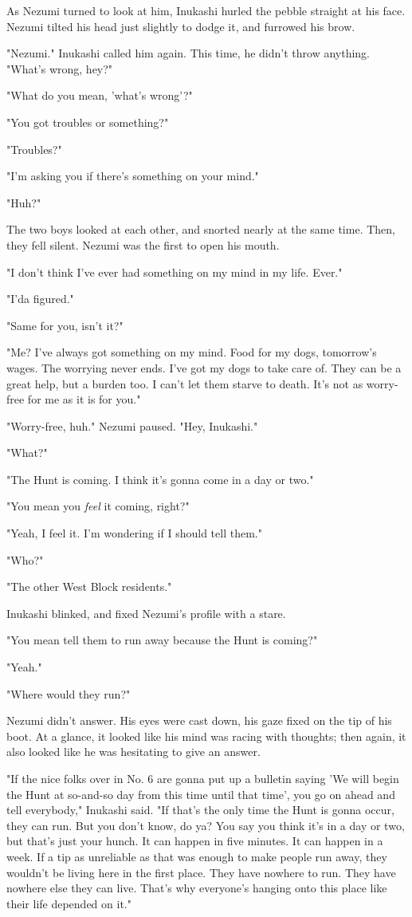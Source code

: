 As Nezumi turned to look at him, Inukashi hurled the pebble straight at
his face. Nezumi tilted his head just slightly to dodge it, and furrowed
his brow.

"Nezumi." Inukashi called him again. This time, he didn't throw
anything. "What's wrong, hey?"

"What do you mean, 'what's wrong'?"

"You got troubles or something?"

"Troubles?"

"I'm asking you if there's something on your mind."~

"Huh?"

The two boys looked at each other, and snorted nearly at the same time.
Then, they fell silent. Nezumi was the first to open his mouth.

"I don't think I've ever had something on my mind in my life. Ever."

"I'da figured."

"Same for you, isn't it?"

"Me? I've always got something on my mind. Food for my dogs, tomorrow's
wages. The worrying never ends. I've got my dogs to take care of. They
can be a great help, but a burden too. I can't let them starve to death.
It's not as worry-free for me as it is for you."

"Worry-free, huh." Nezumi paused. "Hey, Inukashi."

"What?"

"The Hunt is coming. I think it's gonna come in a day or two."

"You mean you \emph{feel} it coming, right?"

"Yeah, I feel it. I'm wondering if I should tell them."

"Who?"

"The other West Block residents."

Inukashi blinked, and fixed Nezumi's profile with a stare.

"You mean tell them to run away because the Hunt is coming?"

"Yeah."

"Where would they run?"

Nezumi didn't answer. His eyes were cast down, his gaze fixed on the tip
of his boot. At a glance, it looked like his mind was racing with
thoughts; then again, it also looked like he was hesitating to give an
answer.

"If the nice folks over in No. 6 are gonna put up a bulletin saying 'We
will begin the Hunt at so-and-so day from this time until that time',
you go on ahead and tell everybody," Inukashi said. "If that's the only
time the Hunt is gonna occur, they can run. But you don't know, do ya?
You say you think it's in a day or two, but that's just your hunch. It
can happen in five minutes. It can happen in a week. If a tip as
unreliable as that was enough to make people run away, they wouldn't be
living here in the first place. They have nowhere to run. They have
nowhere else they can live. That's why everyone's hanging onto this
place like their life depended on it."

